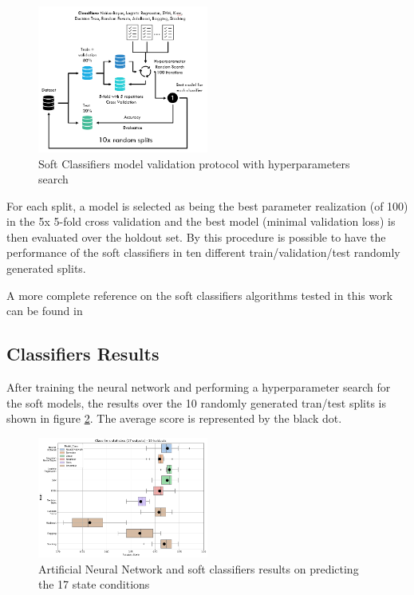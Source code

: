 \documentclass[twocolumn]{article}
\begin{document}
\begin{figure}[H]
      \centering
      \includegraphics[width=0.5\textwidth]{soft_model_protocol.png}
      \caption{Soft Classifiers model validation protocol with hyperparameters search}
      \label{fig:soft_model_protocol}
\end{figure}

For each split, a model is selected as being the best parameter realization (of 100) in the 5x 5-fold cross validation and the best model (minimal validation loss) is then evaluated over the holdout set. By this procedure is possible to have the performance of the soft classifiers in ten different train/validation/test randomly generated splits.

A more complete reference on the soft classifiers algorithms tested in this work can be found in \cite{geron2017hands-on}



\subsection{Classifiers Results}

After training the neural network and performing a hyperparameter search for the soft models, the results over the 10 randomly generated tran/test splits is shown in figure \ref{fig:results}. The average score is represented by the black dot.

\begin{figure}[H]
      \centering
      \includegraphics[width=0.5\textwidth]{results.png}
      \caption{Artificial Neural Network and soft classifiers results on predicting the 17 state conditions}
      \label{fig:results}
\end{figure}
\end{document}
